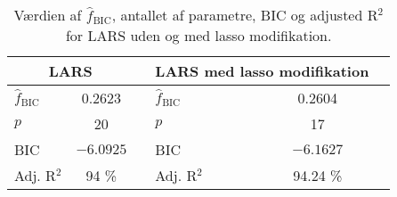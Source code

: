 \begin{table}
\center
\begin{tabular}{lcc | lcc} 
\toprule
\multicolumn{2}{c}{LARS}  & \multicolumn{1}{c}{ } & \multicolumn{2}{c}{LARS med lasso modifikation} \\ \midrule
$\widehat{f}_\text{BIC}$ & 0.2623 & &$\widehat{f}_\text{BIC}$ & 0.2604   \\
$p$ & 20 & & $p$ & 17  \\
BIC & $-6.0925$ && BIC & $-6.1627$  \\
Adj. R$^2$ &94 \% & & Adj. R$^2$ & 94.24 \% \\ \bottomrule
 \end{tabular}
\caption{Værdien af $\widehat{f}_\text{BIC}$, antallet af parametre, BIC og adjusted  R$^2$ for LARS uden og med lasso modifikation.} \label{tab:bic_lars}
\end{table}